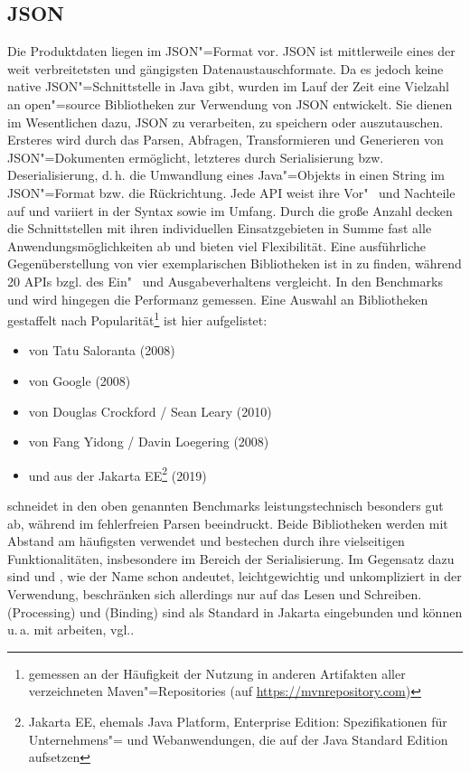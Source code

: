 \subsection{JSON} \label{BibJSON}
Die Produktdaten liegen im JSON"=Format vor. JSON ist mittlerweile eines der weit verbreitetsten und gängigsten Datenaustauschformate. Da es jedoch keine native JSON"=Schnittstelle in Java gibt, wurden im Lauf der Zeit eine Vielzahl an open"=source Bibliotheken zur Verwendung von JSON entwickelt.  Sie dienen im Wesentlichen dazu, JSON zu verarbeiten, zu speichern oder auszutauschen. Ersteres wird durch das Parsen, Abfragen, Transformieren und Generieren von JSON"=Dokumenten ermöglicht, letzteres durch Serialisierung bzw. Deserialisierung, d.\,h. die Umwandlung eines Java"=Objekts in einen String im JSON"=Format bzw. die Rückrichtung. Jede API weist ihre Vor"~ und Nachteile auf und variiert in der Syntax sowie im Umfang. Durch die große Anzahl decken die Schnittstellen mit ihren individuellen Einsatzgebieten in Summe fast alle Anwendungsmöglichkeiten ab und bieten viel Flexibilität. Eine ausführliche Gegenüberstellung von vier exemplarischen Bibliotheken ist in\nbs\cite{json:libs1} zu finden, während\nbs\cite{json:libs2} 20 APIs bzgl. des Ein"~ und Ausgabeverhaltens vergleicht. In den Benchmarks\nbs\cite{json:bm1} und\nbs\cite{json:bm2} wird hingegen die Performanz gemessen. Eine Auswahl an Bibliotheken gestaffelt nach Popularität\footnote{gemessen an der Häufigkeit der Nutzung in anderen Artifakten aller verzeichneten Maven"=Repositories (auf \url{https://mvnrepository.com})} ist hier aufgelistet:
\begin{itemize}
\item {} von Tatu Saloranta (2008)
\item {} von Google (2008)
\item {} von Douglas Crockford / Sean Leary (2010)
\item {} von Fang Yidong / Davin Loegering (2008)
\item {} und  aus der Jakarta EE\footnote{Jakarta EE, ehemals Java Platform, Enterprise Edition: Spezifikationen für Unternehmens"= und Webanwendungen, die auf der Java Standard Edition aufsetzen} (2019)
\end{itemize}
\nbs\cite[S.\,323--403]{java:json} schneidet in den oben genannten Benchmarks leistungstechnisch besonders gut ab, während  \nbs\cite[S.\,243--298]{java:json} im fehlerfreien Parsen beeindruckt. Beide Bibliotheken werden mit Abstand am häufigsten verwendet und bestechen durch ihre vielseitigen Funktionalitäten, insbesondere im Bereich der Serialisierung. Im Gegensatz dazu sind  und , wie der Name schon andeutet, leichtgewichtig und unkompliziert in der Verwendung, beschränken sich allerdings nur auf das Lesen und Schreiben.  (Processing) und  (Binding) sind als Standard in Jakarta eingebunden und können u.\,a. mit  arbeiten, vgl.\nbs\cite[S.\,21--34]{java:cls}.\\
